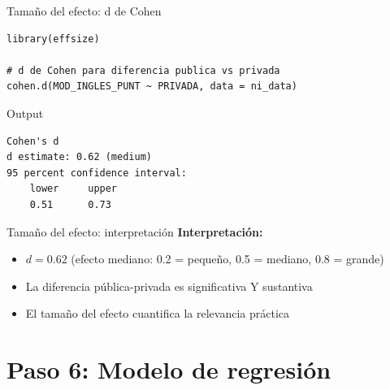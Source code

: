 \documentclass[aspectratio=169, 11pt]{beamer}
\begin{document}
\begin{frame}[fragile]{Tamaño del efecto: d de Cohen}
\begin{lstlisting}
library(effsize)

# d de Cohen para diferencia publica vs privada
cohen.d(MOD_INGLES_PUNT ~ PRIVADA, data = ni_data)
\end{lstlisting}

\vspace{0.2cm}
\begin{exampleblock}{Output}
\small
\begin{verbatim}
Cohen's d
d estimate: 0.62 (medium)
95 percent confidence interval:
    lower     upper
    0.51      0.73
\end{verbatim}
\end{exampleblock}
\end{frame}

\begin{frame}{Tamaño del efecto: interpretación}
\textbf{Interpretación:}
\begin{itemize}
\item $d = 0.62$ (efecto mediano: 0.2 = pequeño, 0.5 = mediano, 0.8 = grande)
\item La diferencia pública-privada es significativa Y sustantiva
\item El tamaño del efecto cuantifica la relevancia práctica
\end{itemize}
\end{frame}

\section{Paso 6: Modelo de regresión}
\end{document}
